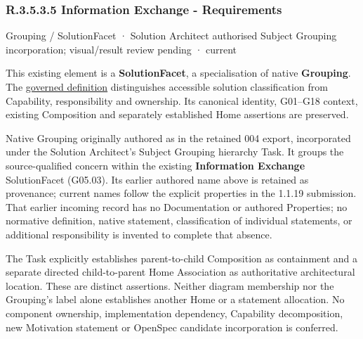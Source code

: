 \subsubsection*{R.3.5.3.5 Information Exchange - Requirements}
\label{navigation:R.3.5.3.5}

\label{element:1de844b879754fd7a21a29f2df3df97b}
{\small Grouping / SolutionFacet · Solution Architect authorised Subject Grouping incorporation; visual/result review pending · current}\par

This existing element is a \textbf{SolutionFacet}, a specialisation of native
\textbf{Grouping}. The \href{\detokenize{../../../../../../../governance/continuum-representation.md#solutionfacet-classification--1119-candidate}}{governed definition}
distinguishes accessible solution classification from Capability, responsibility
and ownership. Its canonical identity, G01–G18 context, existing Composition
and separately established Home assertions are preserved.



Native Grouping originally authored as \texttt{} in the retained 004 export,
incorporated under the Solution Architect's Subject Grouping hierarchy Task.
It groups the source-qualified \texttt{} concern within
the existing \textbf{Information Exchange} SolutionFacet (G05.03). Its earlier authored name above is retained as provenance; current names
follow the explicit properties in the 1.1.19 submission.
That earlier incoming record has no Documentation or authored Properties; no normative
definition, native statement, classification of individual statements, or
additional responsibility is invented to complete that absence.



The Task explicitly establishes parent-to-child Composition as containment and
a separate directed child-to-parent Home Association as authoritative architectural
location. These are distinct assertions. Neither diagram membership nor the
Grouping's label alone establishes another Home or a statement allocation.
No component ownership, implementation dependency, Capability decomposition,
new Motivation statement or OpenSpec candidate incorporation is conferred.



